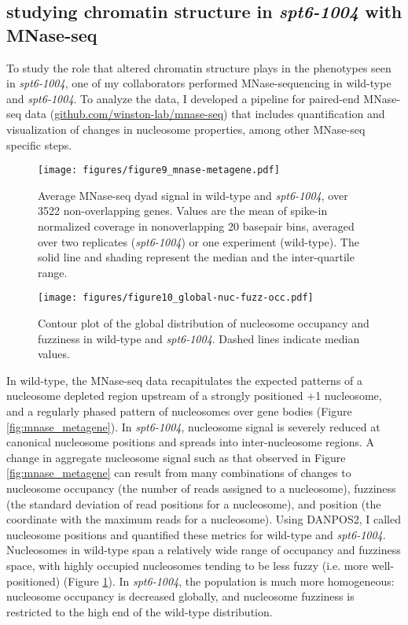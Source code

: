 \documentclass[9pt, letterpaper]{article}
\begin{document}
\subsection{studying chromatin structure in \textit{spt6-1004} with MNase-seq}

To study the role that altered chromatin structure plays in the phenotypes seen in \textit{spt6-1004}, one of my collaborators performed MNase-sequencing in wild-type and \textit{spt6-1004}. To analyze the data, I developed a pipeline for paired-end MNase-seq data (\href{https://github.com/winston-lab/mnase-seq}{github.com/winston-lab/mnase-seq}) that includes quantification and visualization of changes in nucleosome properties, among other MNase-seq specific steps.

\begin{figure}[h]
    \centering
    \begin{minipage}[t]{8.5cm}
        \centering
        \texttt{[image: figures/figure9\_mnase-metagene.pdf]}
        \caption{Average MNase-seq dyad signal in wild-type and \textit{spt6-1004}, over 3522 non-overlapping genes. Values are the mean of spike-in normalized coverage in nonoverlapping 20 basepair bins, averaged over two replicates (\textit{spt6-1004}) or one experiment (wild-type). The solid line and shading represent the median and the inter-quartile range.}
        \label{fig:mnase_metagene}
    \end{minipage}\hfill
    \begin{minipage}[t]{8.5cm}
        \centering
        \texttt{[image: figures/figure10\_global-nuc-fuzz-occ.pdf]}
        \caption{Contour plot of the global distribution of nucleosome occupancy and fuzziness in wild-type and \textit{spt6-1004}. Dashed lines indicate median values.}
        \label{fig:global_nuc_fuzz}
    \end{minipage}
\end{figure}

In wild-type, the MNase-seq data recapitulates the expected patterns of a nucleosome depleted region upstream of a strongly positioned +1 nucleosome, and a regularly phased pattern of nucleosomes over gene bodies (Figure \ref{fig:mnase_metagene}). In \textit{spt6-1004}, nucleosome signal is severely reduced at canonical nucleosome positions and spreads into inter-nucleosome regions. A change in aggregate nucleosome signal such as that observed in Figure \ref{fig:mnase_metagene} can result from many combinations of changes to nucleosome occupancy (the number of reads assigned to a nucleosome), fuzziness (the standard deviation of read positions for a nucleosome), and position (the coordinate with the maximum reads for a nucleosome). Using DANPOS2, I called nucleosome positions and quantified these metrics for wild-type and \textit{spt6-1004}. Nucleosomes in wild-type span a relatively wide range of occupancy and fuzziness space, with highly occupied nucleosomes tending to be less fuzzy (i.e. more well-positioned) (Figure \ref{fig:global_nuc_fuzz}). In \textit{spt6-1004}, the population is much more homogeneous: nucleosome occupancy is decreased globally, and nucleosome fuzziness is restricted to the high end of the wild-type distribution.
\end{document}
